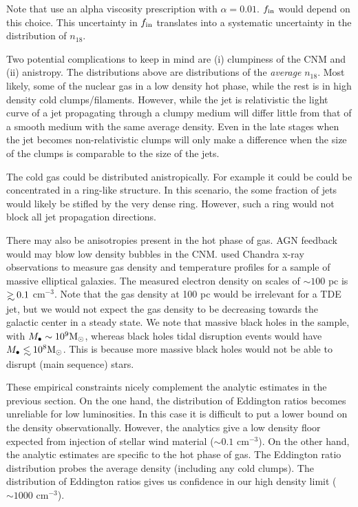 \documentclass[usenatbib,fleqn]{mnras}
\newcommand\lsim{\mathrel{\rlap{\lower4pt\hbox{\hskip1pt$\sim$}}
    \raise1pt\hbox{$<$}}}
\newcommand\gsim{\mathrel{\rlap{\lower4pt\hbox{\hskip1pt$\sim$}}
    \raise1pt\hbox{$>$}}}
\newcommand{\Mbh}[1][]{M_{\bullet#1}}
\newcommand{\Msun}{{\rm M_\odot}}
\begin{document}
Note that \citet{Li+2013} use an alpha viscosity prescription with
$\alpha=0.01$.  $f_{\rm in}$ would depend on this choice. This
uncertainty in $f_{\rm in}$ translates into a systematic uncertainty
in the distribution of $n_{18}$. 
 
Two potential complications to keep in mind are (i) clumpiness of the
CNM and (ii) anistropy. The distributions above are distributions of
the {\it average} $n_{18}$.  Most likely, some of the nuclear gas in a
low density hot phase, while the rest is in high density cold
clumps/filaments.  However, while the jet is relativistic the
light curve of a jet propagating through a clumpy medium will differ
little from that of a smooth medium with the same average
density. Even in the late stages when the jet becomes non-relativistic
clumps will only make a difference when the size of the clumps is
comparable to the size of the jets.

The cold gas could be distributed anistropically. For example it could
be could be concentrated in a ring-like structure. In this scenario,
the some fraction of jets would likely be stifled by the very dense
ring. However, such a ring would not block all jet propagation
directions. 

There may also be anisotropies present in the hot phase of gas. AGN
feedback would may blow low density bubbles in the
CNM. \citet{Russell+2013} used Chandra x-ray observations to measure
gas density and temperature profiles for a sample of massive
elliptical galaxies. The measured electron density on scales of $\sim
100$ pc is $\gsim 0.1$ cm$^{-3}$. Note that the gas density at 100 pc
would be irrelevant for a TDE jet, but we would not expect the gas
density to be decreasing towards the galactic center in a steady
state.  We note that massive black holes in the \citet{Russell+2013}
sample, with $\Mbh\sim 10^{9} \Msun$, whereas black holes tidal
disruption events would have $\Mbh\lsim 10^8 \Msun$. This is because
more massive black holes would not be able to disrupt (main sequence)
stars.


These empirical constraints nicely complement the analytic estimates
in the previous section. On the one hand, the distribution of
Eddington ratios becomes unreliable for low luminosities.  In this
case it is difficult to put a lower bound on the density
observationally. However, the analytics give a low density floor
expected from injection of stellar wind material ($\sim 0.1$
cm$^{-3}$). On the other hand, the analytic estimates are specific to
the hot phase of gas. The Eddington ratio distribution probes the
average density (including any cold clumps). The
distribution of Eddington ratios gives us confidence in our high
density limit ($\sim 1000$ cm$^{-3}$).
\end{document}
